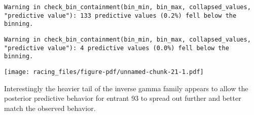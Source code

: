 \documentclass[
  letterpaper,
  DIV=11,
  numbers=noendperiod]{scrartcl}
\newenvironment{Shaded}{\begin{snugshade}}{\end{snugshade}}
\newcommand{\AttributeTok}[1]{\textcolor[rgb]{0.40,0.45,0.13}{#1}}
\newcommand{\ControlFlowTok}[1]{\textcolor[rgb]{0.00,0.23,0.31}{#1}}
\newcommand{\DecValTok}[1]{\textcolor[rgb]{0.68,0.00,0.00}{#1}}
\newcommand{\FunctionTok}[1]{\textcolor[rgb]{0.28,0.35,0.67}{#1}}
\newcommand{\NormalTok}[1]{\textcolor[rgb]{0.00,0.23,0.31}{#1}}
\newcommand{\OtherTok}[1]{\textcolor[rgb]{0.00,0.23,0.31}{#1}}
\newcommand{\SpecialCharTok}[1]{\textcolor[rgb]{0.37,0.37,0.37}{#1}}
\newcommand{\StringTok}[1]{\textcolor[rgb]{0.13,0.47,0.30}{#1}}
\begin{document}
\begin{verbatim}
Warning in check_bin_containment(bin_min, bin_max, collapsed_values,
"predictive value"): 133 predictive values (0.2%) fell below the binning.
\end{verbatim}

\begin{verbatim}
Warning in check_bin_containment(bin_min, bin_max, collapsed_values,
"predictive value"): 4 predictive values (0.0%) fell below the binning.
\end{verbatim}

\texttt{[image: racing\_files/figure-pdf/unnamed-chunk-21-1.pdf]}

Interestingly the heavier tail of the inverse gamma family appears to
allow the posterior predictive behavior for entrant 93 to spread out
further and better match the observed behavior.

\begin{Shaded}
\end{Shaded}
\end{document}
